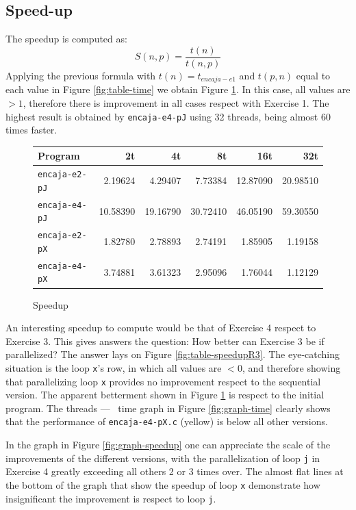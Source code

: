 \documentclass[a4paper]{article}
\begin{document}
\subsection{Speed-up}
The speedup is computed as:
$$S(n,p)=\frac{t(n)}{t(n,p)}$$
Applying the previous formula with $t(n)=t_{encaja-e1}$ and $t(p,n)$ equal to each value in Figure \ref{fig:table-time} we obtain Figure \ref{fig:table-speedup}. In this case, all values are $>1$, therefore there is improvement in all cases respect with Exercise 1. The highest result is obtained by \texttt{encaja-e4-pJ} using 32 threads, being almost 60 times faster.
\begin{figure}[h]
    \centering
    \begin{tabular}{l r r r r r}
        Program               & 2t       & 4t       & 8t       & 16t      & 32t      \\ \hline
        \texttt{encaja-e2-pJ}	  &  2.19624 &  4.29407 &  7.73384 & 12.87090 & 20.98510 \\
        \texttt{encaja-e4-pJ} 	  & 10.58390 & 19.16790 & 30.72410 & 46.05190 & 59.30550 \\
        \texttt{encaja-e2-pX}	  &  1.82780 &  2.78893 &  2.74191 &  1.85905 &  1.19158 \\
        \texttt{encaja-e4-pX}	  &  3.74881 &  3.61323 &  2.95096 &  1.76044 &  1.12129 \\ \hline
    \end{tabular}
    \caption{Speedup}
    \label{fig:table-speedup}
\end{figure}

An interesting speedup to compute would be that of Exercise 4 respect to Exercise 3. This gives answers the question: How better can Exercise 3 be if parallelized? The answer lays on Figure \ref{fig:table-speedupR3}. The eye-catching situation is the loop \texttt{x}'s row, in which all values are $<0$, and therefore showing that parallelizing loop \texttt{x} provides no improvement respect to the sequential version. The apparent betterment shown in Figure \ref{fig:table-speedup} is respect to the initial program. The threads --- \unskip \, time graph in Figure \ref{fig:graph-time} clearly shows that the performance of \texttt{encaja-e4-pX.c} (yellow) is below all other versions.

In the graph in Figure \ref{fig:graph-speedup} one can appreciate the scale of the improvements of the different versions, with the parallelization of loop \texttt{j} in Exercise 4 greatly exceeding all others 2 or 3 times over. The almost flat lines at the bottom of the graph that show the speedup of loop \texttt{x} demonstrate how insignificant the improvement is respect to loop \texttt{j}.
\end{document}

